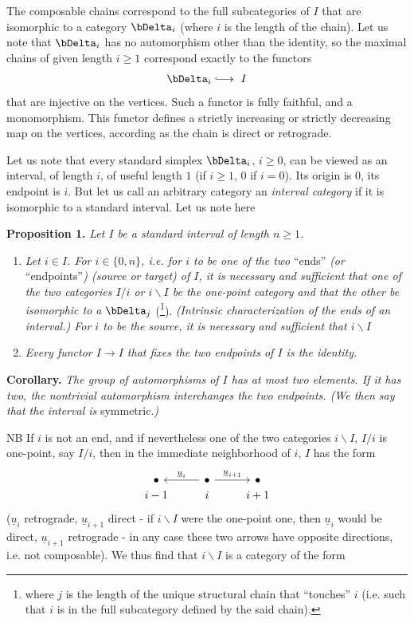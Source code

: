 The composable chains correspond to the full subcategories of $I$ that are isomorphic to a category $\bDelta_i$ (where $i$ is the length of the chain). Let us note that $\bDelta_i$ has no automorphism other than the identity, so the maximal chains of given length $i\geq 1$ correspond exactly to the functors
\[
\bDelta_i\lhook\joinrel\longrightarrow\ I
\]
that are injective on the vertices. Such a functor is fully faithful, and a monomorphism. This functor defines a strictly increasing or strictly decreasing map on
the vertices, according as the chain is direct or retrograde.

Let us note that every standard simplex $\bDelta_i$, $i\geq 0$, can be viewed as an interval, of length $i$, of useful length $1$ (if $i\geq 1$, $0$ if $i=0$). Its origin is $0$, its endpoint is $i$. But let us call an arbitrary category an \textit{interval category} if it is isomorphic to a standard interval. Let us note here

\textbf{Proposition 1.} \textit{Let $I$ be a standard interval of length $n\geq 1$.}

\begin{enumerate}
\item[\textit{a)}] \textit{Let $i\in I$. For $i\in\{0,n\}$, i.e. for $i$ to be one of the two} ``ends'' \textit{(or} ``endpoints''\textit{) (source or target) of $I$, it is necessary and sufficient that one of the two categories $I/i$ or $i\backslash I$ be the one-point category and that the other be isomorphic to a} $\bDelta_j$ (\footnote{where $j$ is the length of the unique structural chain that ``touches'' $i$ (i.e. such that $i$ is in the full subcategory defined by the said chain).}). \textit{(Intrinsic characterization of the ends of an interval.) For $i$ to be the source, it is necessary and sufficient that $i\backslash I$} 
\item[\textit{b)}] \textit{Every functor $I\longrightarrow I$ that fixes the two endpoints of $I$ is the identity.}
\end{enumerate}

\textbf{Corollary.} \textit{The group of automorphisms of $I$ has at most two elements. If it has two, the nontrivial automorphism interchanges the two endpoints. (We then say that the interval is} symmetric.\textit{)}

NB If $i$ is not an end, and if nevertheless one of the two categories $i\backslash I$, $I/i$ is one-point, say $I/i$, then in the immediate neighborhood of $i$, $I$ has the form
\[
\begin{tikzcd}[row sep=0pt]
\bullet & \bullet \arrow[l, "\underline{u}_i"'] \arrow[r, "\underline{u}_{i+1}"] & \bullet \\
i-1 & i & i+1
\end{tikzcd}
\]
($\underline{u}_i$ retrograde, $\underline{u}_{i+1}$ direct - if $i\backslash I$ were the one-point one, then $\underline{u}_i$ would be direct, $\underline{u}_{i+1}$ retrograde - in any case these two arrows have opposite directions, i.e. not composable). We thus find that $i\backslash I$ is a category of the form